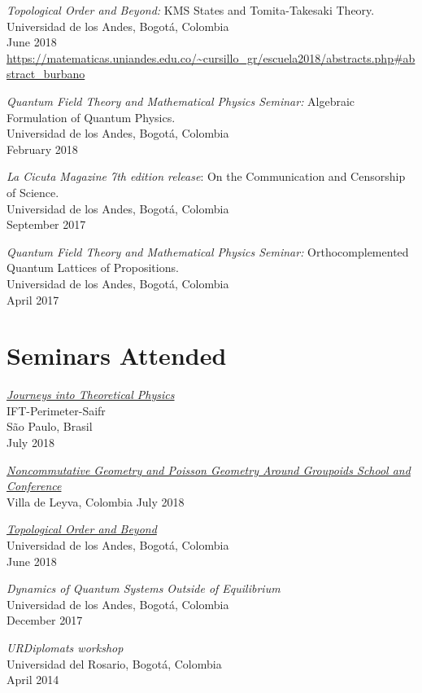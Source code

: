 \documentclass[line,margin]{res}
\begin{document}
\begin{resume}
{\sl Topological Order and Beyond:} KMS States and Tomita-Takesaki Theory.\\
Universidad de los Andes, Bogotá, Colombia\\
June 2018\\
\url{https://matematicas.uniandes.edu.co/~cursillo_gr/escuela2018/abstracts.php#abstract_burbano}

{\sl Quantum Field Theory and Mathematical Physics Seminar:} Algebraic Formulation of Quantum Physics.\\
Universidad de los Andes, Bogotá, Colombia\\
February 2018

{\sl La Cicuta Magazine 7th edition release}: On the Communication and Censorship of Science.\\
Universidad de los Andes, Bogotá, Colombia\\
September 2017

{\sl Quantum Field Theory and Mathematical Physics Seminar:} Orthocomplemented Quantum Lattices of Propositions.\\
Universidad de los Andes, Bogotá, Colombia\\
April 2017
  
  
\section{Seminars Attended}

{\sl \href{http://journeys.ictp-saifr.org/}{Journeys into Theoretical Physics}}\\
IFT-Perimeter-Saifr\\
São Paulo, Brasil\\
July 2018

{\sl \href{https://ncgandpoisson2018.wordpress.com/}{Noncommutative Geometry and Poisson Geometry Around Groupoids School and Conference}}\\
Villa de Leyva, Colombia
July 2018

{\sl \href{https://matematicas.uniandes.edu.co/~cursillo_gr/escuela2018/}{Topological Order and Beyond}}\\
Universidad de los Andes, Bogotá, Colombia\\
June 2018

{\sl Dynamics of Quantum Systems Outside of Equilibrium} \\
Universidad de los Andes, Bogotá, Colombia\\
December 2017

{\sl URDiplomats workshop} \\
Universidad del Rosario, Bogotá, Colombia \\
April 2014  
 

\end{resume}
\end{document}
